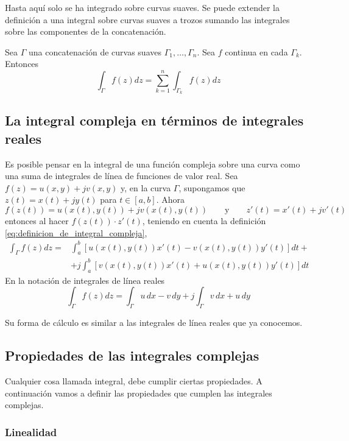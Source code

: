Hasta aquí solo se ha integrado sobre curvas suaves. Se puede extender la definición a una integral sobre curvas suaves a trozos sumando las integrales sobre las componentes de la concatenación.

\begin{definition}
  Sea $\Gamma$ una concatenación de curvas suaves $\Gamma_1,\dots,\Gamma_n$. Sea $f$ continua en cada $\Gamma_k$. Entonces
  $$
  \int_\Gamma f(z)dz=\sum_{k=1}^n \int_{\Gamma_k} f(z)dz
  $$
\end{definition}

\subsection{La integral compleja en términos de integrales reales}

Es posible pensar en la integral de una función compleja sobre una curva como una suma de integrales de línea de funciones de valor real. Sea $f(z)=u(x,y)+jv(x,y)$ y, en la curva $\Gamma$, supongamos que $z(t)=x(t)+jy(t)$ para $t\in[a,b]$. Ahora
$$
f(z(t))=u(x(t),y(t)) + jv(x(t),y(t)) \qquad \text{y} \qquad z'(t)=x'(t)+jv'(t)
$$
entonces al hacer $f(z(t))\cdot z'(t)$, teniendo en cuenta la definición \ref{eq:definicion_de_integral_compleja},
\begin{align*}
  \int_\Gamma f(z)dz =& \int_a^b [u(x(t),y(t))x'(t)-v(x(t),y(t))y'(t)]dt + \\
                      & +j\int_a^b [v(x(t),y(t))x'(t)+u(x(t),y(t))y'(t)]dt
\end{align*}
En la notación de integrales de línea reales
\begin{equation}
  \int_\Gamma f(z)dz = \int_\Gamma u\,dx-v\,dy + j\int_\Gamma v\,dx+u\,dy
\end{equation}

Su forma de cálculo es similar a las integrales de línea reales que ya conocemos.

\subsection{Propiedades de las integrales complejas}

Cualquier cosa llamada integral, debe cumplir ciertas propiedades. A continuación vamos a definir las propiedades que cumplen las integrales complejas.

\subsubsection{Linealidad}

